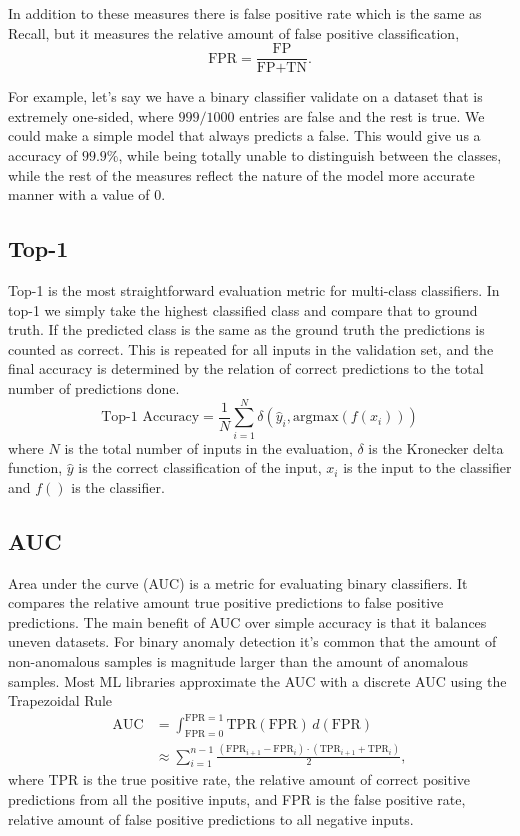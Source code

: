 \documentclass[12pt,a4paper,english
]{tunithesis}
\begin{document}
In addition to these measures there is false positive rate which is the same as Recall, but it measures the relative amount of false positive classification,
\begin{equation}
\text{FPR} = \frac{\text{FP}}{\text{FP} + \text{TN}}.
\end{equation}

For example, let's say we have a binary classifier validate on a dataset that is extremely one-sided, where $999/1000$ entries are false and the rest is true. We could make a simple model that always predicts a false. This would give us a accuracy of $99.9\%$, while being totally unable to distinguish between the classes, while the rest of the measures reflect the nature of the model more accurate manner with a value of $0$.~\cite{DeepLearningBook}

\subsection{Top-1}
Top-1 is the most straightforward evaluation metric for multi-class classifiers. In top-1 we simply take the highest classified class and compare that to ground truth. If the predicted class is the same as the ground truth the predictions is counted as correct. This is repeated for all inputs in the validation set, and the final accuracy is determined by the relation of correct predictions to the total number of predictions done.
\begin{equation}
\text{Top-1 Accuracy} = \frac{1}{N} \sum_{i=1}^{N} \delta(\hat{y}_i, \text{argmax}(f(x_i)))
\end{equation}
where $N$ is the total number of inputs in the evaluation, $\delta$ is the Kronecker delta function, $\hat{y}$ is the correct classification of the input, $x_i$ is the input to the classifier and $f()$ is the classifier.

\subsection{AUC}
Area under the curve (AUC) is a metric for evaluating binary classifiers. It compares the relative amount true positive predictions to false positive predictions.
The main benefit of AUC over simple accuracy is that it balances uneven datasets. For binary anomaly detection it's common that the amount of non-anomalous samples is magnitude larger than the amount of anomalous samples.
Most ML libraries approximate the AUC with a discrete AUC using the Trapezoidal Rule~\cite{paszke_pytorch_2019}
\begin{align}
\text{AUC} & = \int_{\text{FPR}=0}^{\text{FPR}=1} \text{TPR}(\text{FPR}) \, d(\text{FPR}) \\
& \approx \sum_{i=1}^{n-1} \frac{(\text{FPR}_{i+1} - \text{FPR}_i) \cdot (\text{TPR}_{i+1} + \text{TPR}_i)}{2},
\end{align}
where TPR is the true positive rate, the relative amount of correct positive predictions from all the positive inputs, and FPR is the false positive rate, relative amount of false positive predictions to all negative inputs.
\end{document}
